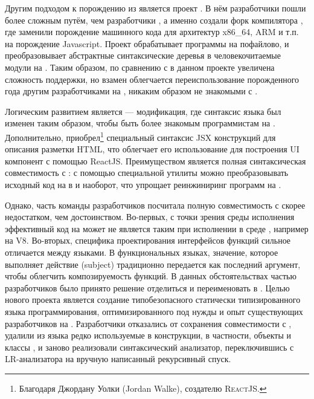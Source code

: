 Другим подходом к порождению \Javascript{} из \OCaml{} является проект \Bucklescript{}. В нём разработчики пошли более сложным путём, чем разработчики \Jsoo{}, а именно создали форк компилятора \OCaml{}, где заменили порождение машинного кода для архитектур x86\_64, ARM и т.п. на порождение Javascript. Проект обрабатывает программы на \OCaml{} пофайлово, и преобразовывает абстрактные синтаксические деревья \OCaml{} в человекочитаемые модули на \Javascript{}. Таким образом, по сравнению с \Jsoo{} в данном проекте увеличена сложность поддержки, но взамен облегчается переиспользование порожденного года другим разработчиками на \Javascript{}, никаким образом не знакомыми с \OCaml{}.


Логическим развитием \Bucklescript{} является \ReasonML{} --- модификация, где синтаксис языка \OCaml{} был изменен таким образом, чтобы быть более знакомым программистам на \Javascript{}. Дополнительно, \ReasonML{} приобрел\footnote{Благодаря Джордану Уолки (Jordan Walke), создателю \textsc{ReactJS}.} специальный синтаксис JSX конструкций для описания разметки HTML, что облегчает его использование для построения UI компонент с помощью ReactJS.
Преимуществом \ReasonML{} является полная синтаксическая совместимость с \OCaml{}: с помощью специальной утилиты можно преобразовывать исходный код на \OCaml{} в \ReasonML{} и наоборот, что упрощает реинжиниринг программ на \OCaml{}.



Однако, часть команды разработчиков \ReasonML{} посчитала полную совместимость с \OCaml{} скорее недостатком, чем достоинством. Во-первых, с точки зрения среды исполнения эффективный код на \OCaml{} может не является таким при исполнении в среде \Javascript{}, например на V8. 
Во-вторых, специфика проектирования интерфейсов функций сильное отличается между языками. В функциональных языках, значение, которое выполняет действие (subject) традиционно передается как последний аргумент, чтобы облегчить композируемость функций. 
В данных обстоятельствах частью разработчиков \ReasonML{} было принято решение отделиться и переименовать \Bucklescript{} в \ReScript{}. Целью нового проекта является создание типобезопасного статически типизированного языка программирования, оптимизированного под нужды и опыт существующих разработчиков на \Javascript{}. Разработчики отказались от сохранения совместимости с \OCaml{}, удалили из языка редко используемые в \ReasonML{} конструкции, в частности, объекты и классы \OCaml{}, и заново реализовали синтаксический анализатор, переключившись с LR-анализатора на вручную написанный рекурсивный спуск.

